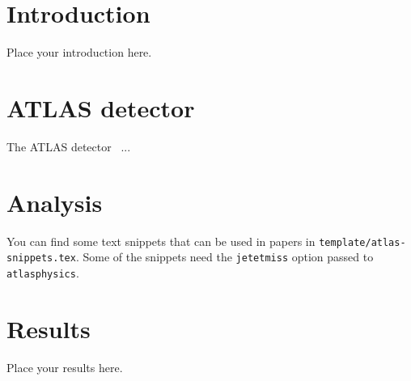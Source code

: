 \documentclass[texmf,UKenglish,texlive=2016]{atlasdoc}
\begin{document}
\maketitle

\tableofcontents


\section{Introduction}
\label{sec:intro}

Place your introduction here.


\section{ATLAS detector}
\label{sec:detector}

The ATLAS detector~\cite{PERF-2007-01} ...
% 


\section{Analysis}
\label{sec:analysis}

You can find some text snippets that can be used in papers in \texttt{template/atlas-snippets.tex}.
Some of the snippets need the \texttt{jetetmiss} option passed to \texttt{atlasphysics}.
%


\section{Results}
\label{sec:result}

Place your results here.

\end{document}
